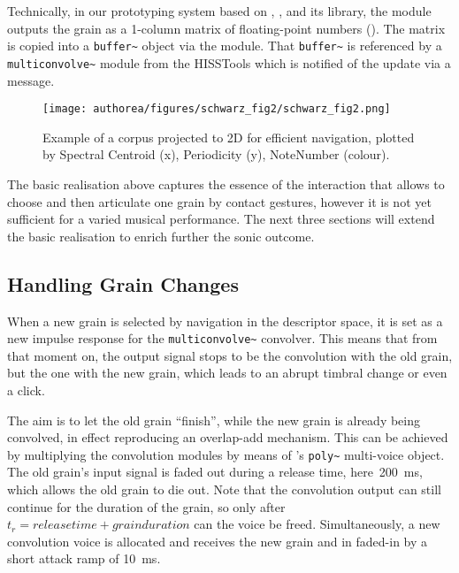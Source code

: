Technically, in our prototyping system based on , , and its   library, the  module outputs the grain as a 1-column matrix of floating-point numbers ().  The matrix is copied into a \verb|buffer~| object via the  module.
That \verb|buffer~| is referenced by a \verb|multiconvolve~| module from the HISSTools which is notified of the update via a message.

\begin{figure}[tbh]
\begin{center}
\texttt{[image: authorea/figures/schwarz\_fig2/schwarz\_fig2.png]}
\caption{Example of a corpus projected to 2D for efficient navigation, plotted by Spectral Centroid (x), Periodicity (y), NoteNumber (colour).}\label{fig:corpus}
\end{center}
\end{figure}

The basic realisation above captures the essence of the interaction that allows to choose and then articulate one grain by contact gestures, however it is not yet sufficient for a varied musical performance.  The next three sections will extend the basic realisation to enrich further the sonic outcome.


\subsection{Handling Grain Changes}\label{sec:set}

\begin{sloppypar}
When a new grain is selected by navigation in the descriptor space, it is set as a new impulse response for the \verb|multiconvolve~| convolver.  This means that from that moment on, the output signal stops to be the convolution with the old grain, but the one with the new grain, which leads to an abrupt timbral change or even a click.
\end{sloppypar}

The aim is to let the old grain ``finish'', while the new grain is already being convolved, in effect reproducing an overlap-add mechanism.  This can be achieved by multiplying the convolution modules by means of \maxmsp's \verb|poly~| multi-voice object.  The old grain's input signal is faded out during a release time, here~200~ms, which allows the old grain to die out.  Note that the convolution output can still continue for the duration of the grain, so only after $t_r = release time + grain duration$ can the voice be freed.  Simultaneously, a new convolution voice is allocated and receives the new grain and in faded-in by a short attack ramp of 10~ms.

